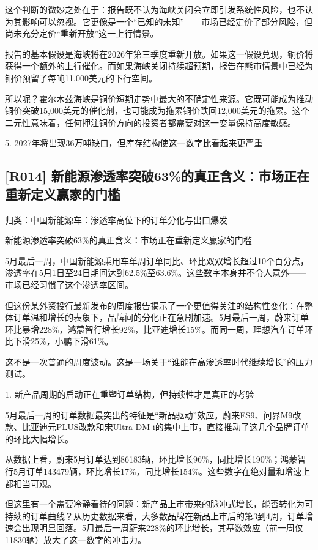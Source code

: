 \documentclass[11pt]{ctexart}
\begin{document}
这个判断的微妙之处在于：报告既不认为海峡关闭会立即引发系统性风险，也不认为其影响可以忽视。它更像是一个“已知的未知”——市场已经定价了部分风险，但尚未充分定价“重新开放”这一上行情景。

报告的基本假设是海峡将在2026年第三季度重新开放。如果这一假设兑现，铜价将获得一个额外的上行催化。而如果海峡关闭持续超预期，报告在熊市情景中已经为铜价预留了每吨11,000美元的下行空间。

所以呢？霍尔木兹海峡是铜价短期走势中最大的不确定性来源。它既可能成为推动铜价突破15,000美元的催化剂，也可能成为拖累铜价跌回12,000美元的拖累。这个二元性意味着，任何押注铜价方向的投资者都需要对这一变量保持高度敏感。

5. 2027年将出现36万吨缺口，但库存结构使这一数字比看起来更严重

\subsection{[R014] 新能源渗透率突破63\%的真正含义：市场正在重新定义赢家的门槛}
{\small\color{refgray}归类：中国新能源车：渗透率高位下的订单分化与出口爆发}

新能源渗透率突破63\%的真正含义：市场正在重新定义赢家的门槛

5月最后一周，中国新能源乘用车单周订单同比、环比双双增长超过10个百分点，渗透率在5月1日至24日期间达到62.5\%至63.6\%。这些数字本身并不令人意外——市场已经习惯了这个渗透率区间。

但这份某外资投行最新发布的周度报告揭示了一个更值得关注的结构性变化：在整体订单温和增长的表象下，品牌间的分化正在急剧加速。5月最后一周，蔚来订单环比暴增228\%，鸿蒙智行增长92\%，比亚迪增长15\%。而同一周，理想汽车订单环比下滑25\%，小鹏下滑61\%。

这不是一次普通的周度波动。这是一场关于“谁能在高渗透率时代继续增长”的压力测试。

1. 新产品周期的启动正在重塑订单结构，但持续性才是真正的考验

5月最后一周的订单数据最突出的特征是“新品驱动”效应。蔚来ES9、问界M9改款、比亚迪元PLUS改款和宋Ultra DM-i的集中上市，直接推动了这几个品牌订单的环比大幅增长。

从数据上看，蔚来5月订单达到86183辆，环比增长96\%，同比增长190\%；鸿蒙智行5月订单143479辆，环比增长17\%，同比增长154\%。这些数字在绝对量和增速上都相当可观。

但这里有一个需要冷静看待的问题：新产品上市带来的脉冲式增长，能否转化为可持续的订单曲线？从历史数据来看，大多数品牌在新品上市后的第3到4周，订单增速会出现明显回落。5月最后一周蔚来228\%的环比增长，其基数效应（前一周仅11830辆）放大了这一数字的冲击力。
\end{document}
